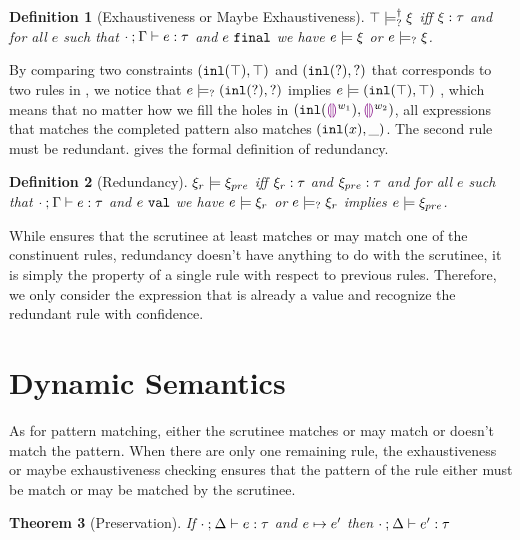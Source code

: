 \documentclass[acmsmall,screen,review,nonacm]{acmart}
\theoremstyle{slplain}
\newtheorem{thm}{Theorem}  %
\numberwithin{thm}{section}
\newtheorem{defn}[thm]{Definition}
\begin{document}
\begin{defn}[Exhaustiveness or Maybe Exhaustiveness]
  \label{defn:exhaustiveness}
  $\top \models_{?}^{\dag} \xi$ iff $\xi : \tau$ and for all $e$ such that $\cdot \mathbin{;} \Gamma \vdash e : \tau$ and $e ~\mathtt{final}$ we have $e \models \xi$ or $e \models_{?} \xi$.
\end{defn}

By comparing two constraints $(\mathtt{inl}(\top) , \top)$ and $(\mathtt{inl}(\mathtt{?}) , \mathtt{?})$ that corresponds to two rules in , we notice that
$e \models_{?} (\mathtt{inl}(\mathtt{?}) , \mathtt{?})$ implies $e \models (\mathtt{inl}(\top) , \top)$
, which means that no matter how we fill the holes in $(\mathtt{inl}(\textcolor{violet}{\llparenthesis}\textcolor{violet}{\rrparenthesis}^{w_1}) , \textcolor{violet}{\llparenthesis}\textcolor{violet}{\rrparenthesis}^{w_2})$, all expressions that matches the completed pattern also matches $(\mathtt{inl}(x) , \_)$. The second rule must be redundant.
 gives the formal definition of redundancy.

\begin{defn}[Redundancy]
  \label{defn:redundancy}
  $\xi_r \models \xi_{pre}$ iff $\xi_r : \tau$ and $\xi_{pre} : \tau$ and for all $e$ such that $\cdot \mathbin{;} \Gamma \vdash e : \tau$ and $e ~\mathtt{val}$ we have $e \models \xi_r$ or $e \models_{?} \xi_r$ implies $e \models \xi_{pre}$.
\end{defn}

While  ensures that the scrutinee at least matches or may match one of the constinuent rules, redundancy doesn't have anything to do with the scrutinee, it is simply the property of a single rule with respect to previous rules. Therefore, we only consider the expression that is already a value and recognize the redundant rule with confidence.

\section{Dynamic Semantics}
\label{sec:dynamics}

As for pattern matching, either the scrutinee matches or may match or doesn't match the pattern.
When there are only one remaining rule, the exhaustiveness or maybe exhaustiveness checking ensures that the pattern of the rule either must be match or may be matched by the scrutinee.

\begin{thm}[Preservation]
  \label{thrm:preservation}
  If $\cdot \mathbin{;} \Delta \vdash e : \tau$ and $e \mapsto e'$
  then $\cdot \mathbin{;} \Delta \vdash e' : \tau$
\end{thm}
\end{document}
